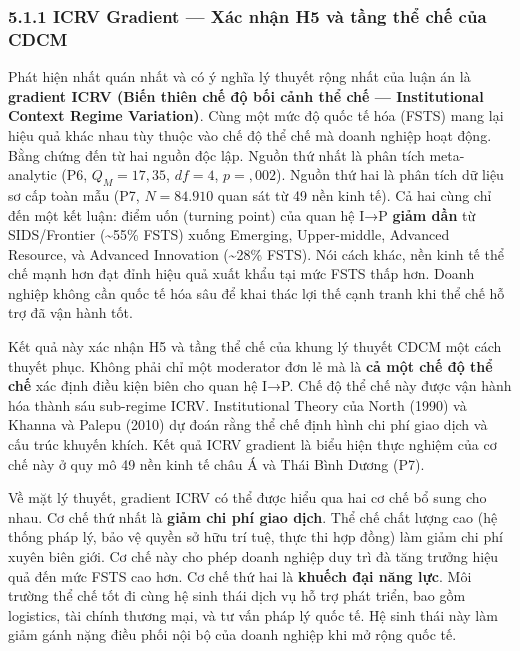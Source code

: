 \documentclass[12pt,a4paper]{article}
\begin{document}
\hypertarget{511-icrv-gradient--xuxe1c-nhux1eadn-h5-vuxe0-tux1ea7ng-thux1ec3-chux1ebf-cux1ee7a-cdcm}{%
\subsubsection{5.1.1 ICRV Gradient --- Xác nhận H5 và tầng thể chế của
CDCM}\label{511-icrv-gradient--xuxe1c-nhux1eadn-h5-vuxe0-tux1ea7ng-thux1ec3-chux1ebf-cux1ee7a-cdcm}}

Phát hiện nhất quán nhất và có ý nghĩa lý thuyết rộng nhất của luận án
là \textbf{gradient ICRV (Biến thiên chế độ bối cảnh thể chế ---
Institutional Context Regime Variation)}. Cùng một mức độ quốc tế hóa
(FSTS) mang lại hiệu quả khác nhau tùy thuộc vào chế độ thể chế mà doanh
nghiệp hoạt động. Bằng chứng đến từ hai nguồn độc lập. Nguồn thứ nhất là
phân tích meta-analytic (P6, \(Q_M = 17{,}35\), \(df = 4\),
\(p = {,}002\)). Nguồn thứ hai là phân tích dữ liệu sơ cấp toàn mẫu (P7,
\(N = 84.910\) quan sát từ 49 nền kinh tế). Cả hai cùng chỉ đến một kết
luận: điểm uốn (turning point) của quan hệ I→P \textbf{giảm dần} từ
SIDS/Frontier (\textasciitilde55\% FSTS) xuống Emerging, Upper-middle,
Advanced Resource, và Advanced Innovation (\textasciitilde28\% FSTS).
Nói cách khác, nền kinh tế thể chế mạnh hơn đạt đỉnh hiệu quả xuất khẩu
tại mức FSTS thấp hơn. Doanh nghiệp không cần quốc tế hóa sâu để khai
thác lợi thế cạnh tranh khi thể chế hỗ trợ đã vận hành tốt.

Kết quả này xác nhận H5 và tầng thể chế của khung lý thuyết CDCM một
cách thuyết phục. Không phải chỉ một moderator đơn lẻ mà là \textbf{cả
một chế độ thể chế} xác định điều kiện biên cho quan hệ I→P. Chế độ thể
chế này được vận hành hóa thành sáu sub-regime ICRV. Institutional
Theory của North (1990) và Khanna và Palepu (2010) dự đoán rằng thể chế
định hình chi phí giao dịch và cấu trúc khuyến khích. Kết quả ICRV
gradient là biểu hiện thực nghiệm của cơ chế này ở quy mô 49 nền kinh tế
châu Á và Thái Bình Dương (P7).

Về mặt lý thuyết, gradient ICRV có thể được hiểu qua hai cơ chế bổ sung
cho nhau. Cơ chế thứ nhất là \textbf{giảm chi phí giao dịch}. Thể chế
chất lượng cao (hệ thống pháp lý, bảo vệ quyền sở hữu trí tuệ, thực thi
hợp đồng) làm giảm chi phí xuyên biên giới. Cơ chế này cho phép doanh
nghiệp duy trì đà tăng trưởng hiệu quả đến mức FSTS cao hơn. Cơ chế thứ
hai là \textbf{khuếch đại năng lực}. Môi trường thể chế tốt đi cùng hệ
sinh thái dịch vụ hỗ trợ phát triển, bao gồm logistics, tài chính thương
mại, và tư vấn pháp lý quốc tế. Hệ sinh thái này làm giảm gánh nặng điều
phối nội bộ của doanh nghiệp khi mở rộng quốc tế.
\end{document}

